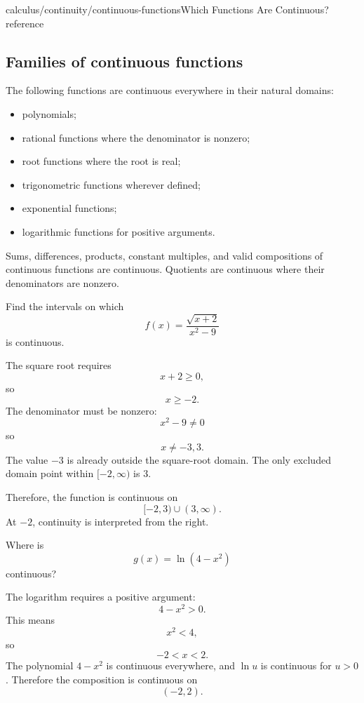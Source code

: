 \begin{webpage}{calculus/continuity/continuous-functions}{Which Functions Are Continuous?}{reference}
\subsection{Families of continuous functions}

The following functions are continuous everywhere in their natural domains:

\begin{itemize}
  \item polynomials;
  \item rational functions where the denominator is nonzero;
  \item root functions where the root is real;
  \item trigonometric functions wherever defined;
  \item exponential functions;
  \item logarithmic functions for positive arguments.
\end{itemize}

Sums, differences, products, constant multiples, and valid compositions of continuous functions are continuous. Quotients are continuous where their denominators are nonzero.

\begin{bgexample}[title={Find intervals of continuity}]
Find the intervals on which
\[
  f(x)=\frac{\sqrt{x+2}}{x^2-9}
\]
is continuous.

\begin{bgsolution}
The square root requires
\[
  x+2\ge0,
\]
so
\[
  x\ge-2.
\]
The denominator must be nonzero:
\[
  x^2-9\ne0
\]
so
\[
  x\ne-3,3.
\]
The value \(-3\) is already outside the square-root domain. The only excluded domain point within \([-2,\infty)\) is \(3\).

Therefore, the function is continuous on
\[
  \boxed{[-2,3)\cup(3,\infty)}.
\]
At \(-2\), continuity is interpreted from the right.
\end{bgsolution}
\end{bgexample}

\begin{bgexample}[title={Composition}]
Where is
\[
  g(x)=\ln(4-x^2)
\]
continuous?

\begin{bgsolution}
The logarithm requires a positive argument:
\[
  4-x^2>0.
\]
This means
\[
  x^2<4,
\]
so
\[
  -2<x<2.
\]
The polynomial \(4-x^2\) is continuous everywhere, and \(\ln u\) is continuous for \(u>0\). Therefore the composition is continuous on
\[
  \boxed{(-2,2)}.
\]
\end{bgsolution}
\end{bgexample}
\end{webpage}


